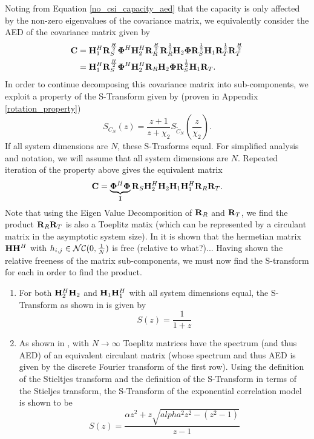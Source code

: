 Noting from Equation \eqref{no_csi_capacity_aed} that the capacity is only affected by the non-zero eigenvalues of the covariance matrix, we equivalently
consider the AED of the covariance matrix given by 
	\begin{align}
	\mathbf{C} &  =  \mathbf{H}_{1}^H \mathbf{R}_{S}^{\frac{H}{2}}\boldsymbol{\Phi}^H \mathbf{H}_{2}^H \mathbf{R}_{R}^{\frac{H}{2}}
	 \mathbf{R}_{R}^{\frac{1}{2}}\mathbf{H}_{2}\boldsymbol{\Phi} \mathbf{R}_{S}^{\frac{1}{2}}\mathbf{H}_{1}\mathbf{R}_{T}^{\frac{1}{2}}\mathbf{R}_{T}^{\frac{H}{2}}
	 \\
	 &  =  
	 \mathbf{H}_{1}^H \mathbf{R}_{S}^{\frac{H}{2}}\boldsymbol{\Phi}^H \mathbf{H}_{2}^H \mathbf{R}_{R}\mathbf{H}_{2}\boldsymbol{\Phi} \mathbf{R}_{S}^{\frac{1}{2}}\mathbf{H}_{1}\mathbf{R}_{T}.
	\end{align}
In order to continue decomposing this covariance matrix into sub-components, we exploit a property of the S-Transform given by (proven in Appendix \ref{rotation_property})
\begin{equation}
S_{C_N}(z) = \frac{z+1}{z+\chi_2} S_{\tilde{C}_N}(\frac{z}{\chi_2}).
\end{equation}
If all system dimensions are $N$, these S-Trasforms equal. For simplified analysis and notation, we will assume that all system dimensions are $N$.
Repeated iteration of the property above gives the equivalent matrix
	\begin{equation}
	\mathbf{C} =
\underbrace{\boldsymbol{\Phi}^H \boldsymbol{\Phi}}_{\mathbf{I}}
	\mathbf{R}_{S}
	 \mathbf{H}_{2}^H \mathbf{H}_{2}
	 \mathbf{H}_{1}\mathbf{H}_{1}^H 
	  \mathbf{R}_{R}
	 \mathbf{R}_{T}.
	\end{equation}
Note that using the Eigen Value Decomposition of $\mathbf{R}_{R}$ and $\mathbf{R}_{T}$, we find the product $\mathbf{R}_{R} \mathbf{R}_{T}$ is also a Toeplitz matix (which can be represented by a circulant matrix in the asymptotic system size).
In \cite[Section 4.3.2]{muller2013applications} it is shown that the hermetian matrix $\mathbf{H}\mathbf{H}^H$ with $h_{i,j} \in \mathcal{NC}(0,\frac{1}{N})$
is free (relative to what?)...
Having shown the relative freeness of the matrix sub-components, we must now find the S-transform for each in order to find the product.
\begin{enumerate}
\item 
	For both $\mathbf{H}_{2}^H \mathbf{H}_{2}$ and $\mathbf{H}_{1}\mathbf{H}_{1}^H$ with all system dimensions equal, the S-Transform as shown in \cite{muller2002random} is given by 
	\begin{equation}
	S(z) = \frac{1}{1+z}
	\end{equation}
\item 
	As shown in \cite{gray2006toeplitz}, with $N \rightarrow \infty$ Toeplitz matrices have the spectrum (and thus AED) of an equivalent circulant matrix (whose spectrum and thus AED is given by the discrete Fourier transform of the first row). Using the definition of the Stieltjes transform and the definition of the S-Transform in terms of the Stieljes transform, the S-Transform of the exponential correlation model is shown to be \cite{skupch2005free}
	\begin{equation}
	S(z) = \frac{\alpha z^2 + z \sqrt{alpha^2 z^2 -(z^2-1)}}{z-1}
	\end{equation}
\end{enumerate}

